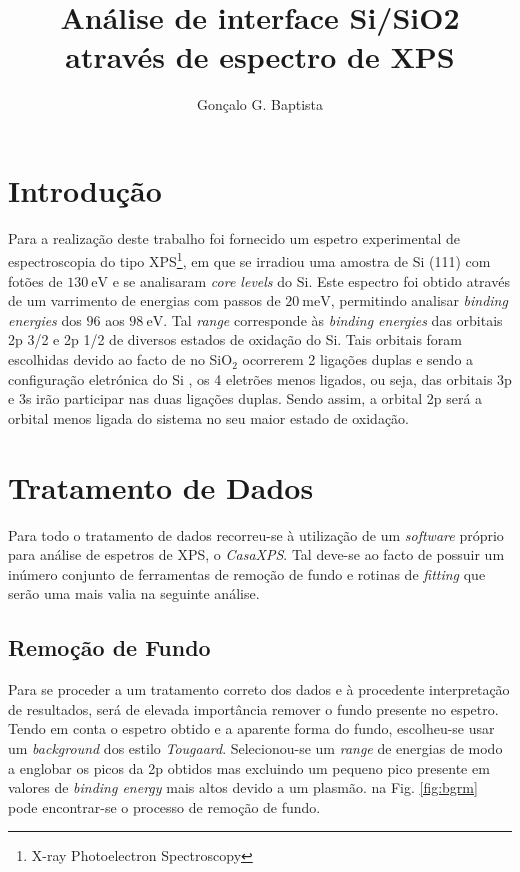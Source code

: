 \documentclass[baaa]{baaa}
\title{Análise de interface Si/SiO2\\através de espectro de XPS}
\author{
Gonçalo G. Baptista\inst{1}
}
\institute{
NOVA School of Science and Technology, NOVA SST, Portugal
}
\begin{document}
\maketitle

\section{Introdução}\label{S_intro}

Para a realização deste trabalho foi fornecido um espetro experimental de espectroscopia do tipo XPS\footnote{X-ray Photoelectron Spectroscopy}, em que se irradiou uma amostra de Si (111) com fotões de $130\ \si{\electronvolt}$ e se analisaram \textit{core levels} do Si. Este espectro foi obtido através de um varrimento de energias com passos de $20\ \si{\milli\electronvolt}$, permitindo analisar \textit{binding energies} dos $96$ aos $98\ \si{\electronvolt}$. Tal \textit{range} corresponde às \textit{binding energies} das orbitais 2p 3/2 e 2p 1/2 de diversos estados de oxidação do Si. Tais orbitais foram escolhidas devido ao facto de no SiO$_2$ ocorrerem 2 ligações duplas e sendo a configuração eletrónica do Si , os 4 eletrões menos ligados, ou seja, das orbitais 3p e 3s irão participar nas duas ligações duplas. Sendo assim, a orbital 2p será a orbital menos ligada do sistema no seu maior estado de oxidação.


\section{Tratamento de Dados}
Para todo o tratamento de dados recorreu-se à utilização de um \textit{software} próprio para análise de espetros de XPS, o \textit{CasaXPS}. Tal deve-se ao facto de possuir um inúmero conjunto de ferramentas de remoção de fundo e rotinas de \textit{fitting} que serão uma mais valia na seguinte análise.


\subsection{Remoção de Fundo}

Para se proceder a um tratamento correto dos dados e à procedente interpretação de resultados, será de elevada importância remover o fundo presente no espetro. Tendo em conta o espetro obtido e a aparente forma do fundo, escolheu-se usar um \textit{background} dos estilo \textit{Tougaard}. Selecionou-se um \textit{range} de energias de modo a englobar os picos da 2p obtidos mas excluindo um pequeno pico presente em valores de \textit{binding energy} mais altos devido a um plasmão. na Fig. \ref{fig:bgrm} pode encontrar-se o processo de remoção de fundo.
\end{document}
